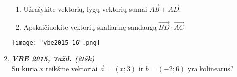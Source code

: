 \documentclass[a4paper]{article}
\newcommand{\tbf}[1]{\textbf{#1}}
\newcommand{\tit}[1]{\textit{#1}}
\begin{document}
\begin{enumerate}
\begin{minipage}[b]{0.7\linewidth}
\begin{enumerate}
\item Užrašykite vektorių, lygų vektorių sumai $\overrightarrow{AB}+\overrightarrow{AD}$.
\item Apskaičiuokite vektorių skaliarinę sandaugą $\overrightarrow{BD}\cdot \overrightarrow{AC}$
\end{enumerate}
\end{minipage}
\hspace{\fill} \begin{minipage}{0.15\linewidth} \texttt{[image: "vbe2015\_16".png]}\end{minipage}
\item \tbf{\tit{VBE 2015, 7užd. (2tšk)}}\\
Su kuria $x$ reikšme vektoriai $\overrightarrow{a}=(x; 3)\text{ ir }b=(-2; 6)$ yra kolinearūs?
\end{enumerate}
\end{document}
